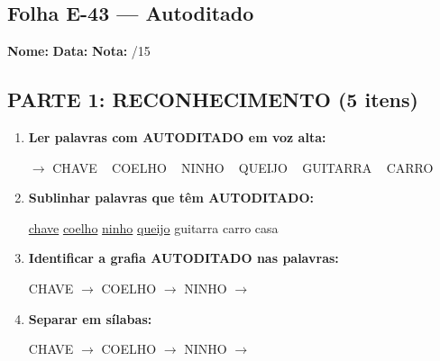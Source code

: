 \subsection{Folha E-43 --- Autoditado}
\begin{exercicio}



\noindent\textbf{Nome:} \underline{\hspace{3.2cm}} \quad \textbf{Data:} \underline{\hspace{1.6cm}} \quad \textbf{Nota:} \underline{\hspace{0.9cm}}/15


\subsection*{PARTE 1: RECONHECIMENTO (5 itens)}

\begin{enumerate}

  \item \textbf{Ler palavras com AUTODITADO em voz alta:}
  \begin{center}
  $\rightarrow$ CHAVE ~ COELHO ~ NINHO ~ QUEIJO ~ GUITARRA ~ CARRO
  \end{center}

  \item \textbf{Sublinhar palavras que têm AUTODITADO:}

\begin{center}
  \uline{chave} \quad \uline{coelho} \quad \uline{ninho} \quad \uline{queijo} \quad guitarra \quad carro \quad casa
\end{center}

  \item \textbf{Identificar a grafia AUTODITADO nas palavras:}
  \begin{center}
  CHAVE $\rightarrow$ \underline{\hspace{1cm}} \quad COELHO $\rightarrow$ \underline{\hspace{1cm}} \quad NINHO $\rightarrow$ \underline{\hspace{1cm}}
  \end{center}

  \item \textbf{Separar em sílabas:}
  \begin{center}
  CHAVE $\rightarrow$ \underline{\hspace{1.2cm}} \quad COELHO $\rightarrow$ \underline{\hspace{1.2cm}} \quad NINHO $\rightarrow$ \underline{\hspace{1.2cm}}
  \end{center}


\end{enumerate}
\end{exercicio}
